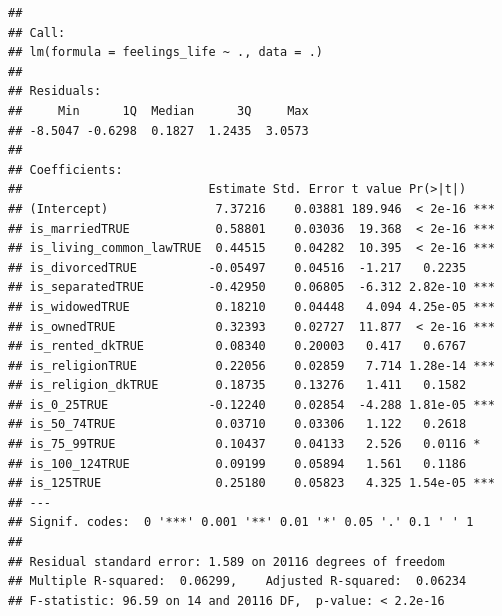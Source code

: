 \documentclass[]{article}
\begin{document}
\begin{verbatim}
## 
## Call:
## lm(formula = feelings_life ~ ., data = .)
## 
## Residuals:
##     Min      1Q  Median      3Q     Max 
## -8.5047 -0.6298  0.1827  1.2435  3.0573 
## 
## Coefficients:
##                          Estimate Std. Error t value Pr(>|t|)    
## (Intercept)               7.37216    0.03881 189.946  < 2e-16 ***
## is_marriedTRUE            0.58801    0.03036  19.368  < 2e-16 ***
## is_living_common_lawTRUE  0.44515    0.04282  10.395  < 2e-16 ***
## is_divorcedTRUE          -0.05497    0.04516  -1.217   0.2235    
## is_separatedTRUE         -0.42950    0.06805  -6.312 2.82e-10 ***
## is_widowedTRUE            0.18210    0.04448   4.094 4.25e-05 ***
## is_ownedTRUE              0.32393    0.02727  11.877  < 2e-16 ***
## is_rented_dkTRUE          0.08340    0.20003   0.417   0.6767    
## is_religionTRUE           0.22056    0.02859   7.714 1.28e-14 ***
## is_religion_dkTRUE        0.18735    0.13276   1.411   0.1582    
## is_0_25TRUE              -0.12240    0.02854  -4.288 1.81e-05 ***
## is_50_74TRUE              0.03710    0.03306   1.122   0.2618    
## is_75_99TRUE              0.10437    0.04133   2.526   0.0116 *  
## is_100_124TRUE            0.09199    0.05894   1.561   0.1186    
## is_125TRUE                0.25180    0.05823   4.325 1.54e-05 ***
## ---
## Signif. codes:  0 '***' 0.001 '**' 0.01 '*' 0.05 '.' 0.1 ' ' 1
## 
## Residual standard error: 1.589 on 20116 degrees of freedom
## Multiple R-squared:  0.06299,    Adjusted R-squared:  0.06234 
## F-statistic: 96.59 on 14 and 20116 DF,  p-value: < 2.2e-16
\end{verbatim}
\end{document}
